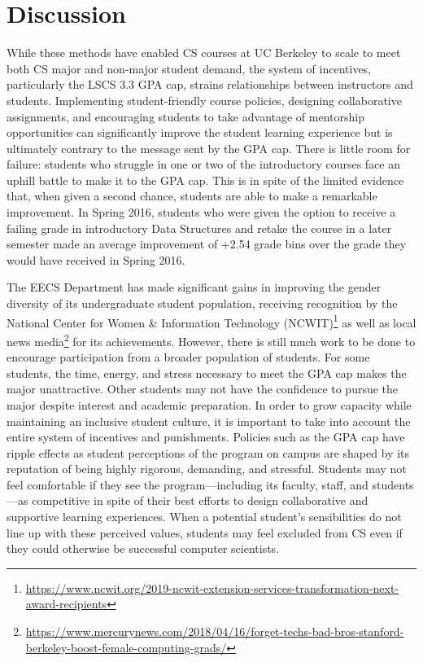 \chapter{Discussion}
\label{chapter:discussion}

While these methods have enabled CS courses at UC Berkeley to scale to meet both CS major and non-major student demand, the system of incentives, particularly the LSCS 3.3 GPA cap, strains relationships between instructors and students. Implementing student-friendly course policies, designing collaborative assignments, and encouraging students to take advantage of mentorship opportunities can significantly improve the student learning experience but is ultimately contrary to the message sent by the GPA cap. There is little room for failure: students who struggle in one or two of the introductory courses face an uphill battle to make it to the GPA cap. This is in spite of the limited evidence that, when given a second chance, students are able to make a remarkable improvement. In Spring 2016, students who were given the option to receive a failing grade in introductory Data Structures and retake the course in a later semester made an average improvement of +2.54 grade bins over the grade they would have received in Spring 2016.

The EECS Department has made significant gains in improving the gender diversity of its undergraduate student population, receiving recognition by the National Center for Women \& Information Technology (NCWIT)\footnote{\url{https://www.ncwit.org/2019-ncwit-extension-services-transformation-next-award-recipients}} as well as local news media\footnote{\url{https://www.mercurynews.com/2018/04/16/forget-techs-bad-bros-stanford-berkeley-boost-female-computing-grads/}} for its achievements. However, there is still much work to be done to encourage participation from a broader population of students. For some students, the time, energy, and stress necessary to meet the GPA cap makes the major unattractive. Other students may not have the confidence to pursue the major despite interest and academic preparation. In order to grow capacity while maintaining an inclusive student culture, it is important to take into account the entire system of incentives and punishments. Policies such as the GPA cap have ripple effects as student perceptions of the program on campus are shaped by its reputation of being highly rigorous, demanding, and stressful. Students may not feel comfortable if they see the program---including its faculty, staff, and students---as competitive in spite of their best efforts to design collaborative and supportive learning experiences. When a potential student's sensibilities do not line up with these perceived values, students may feel excluded from CS even if they could otherwise be successful computer scientists.

